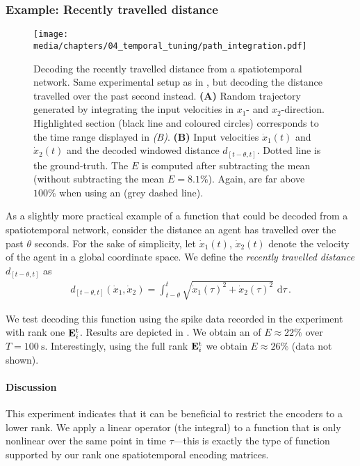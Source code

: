 \subsubsection{Example: Recently travelled distance}

\begin{figure}
	\texttt{[image: media/chapters/04\_temporal\_tuning/path\_integration.pdf]}
	\caption[Decoding the recently travelled distance from a spatiotemporal network]{Decoding the recently travelled distance from a spatiotemporal network. Same experimental setup as in , but decoding the distance travelled over the past second instead.
	\textbf{(A)} Random trajectory generated by integrating the input velocities in $x_1$- and $x_2$-direction.
	Highlighted section (black line and coloured circles) corresponds to the time range displayed in \emph{(B)}.
	\textbf{(B)} Input velocities $\dot x_1(t)$ and $\dot x_2(t)$ and the decoded windowed distance $d_{[t - \theta, t]}$.
	Dotted line is the ground-truth. The \NRMSE $E$ is computed after subtracting the mean (without subtracting the mean $E = 8.1\%$).
	Again, \NRMSEpl are far above $100\%$ when using an \ESN (grey dashed line).
	}
	\label{fig:path_integration}
\end{figure}

As a slightly more practical example of a function that could be decoded from a spatiotemporal network, consider the distance an agent has travelled over the past $\theta$ seconds.
For the sake of simplicity, let $\dot x_1(t)$, $\dot x_2(t)$ denote the velocity of the agent in a global coordinate space.
We define the \emph{recently travelled distance} $d_{[t - \theta, t]}$ as
\begin{align*}
	d_{[t - \theta, t]}(\dot x_1, \dot x_2) = \int_{t - \theta}^t \sqrt{\dot x_1(\tau)^2 + \dot x_2(\tau)^2} \,\,\mathrm{d}\tau \,.
\end{align*}

We test decoding this function using the spike data recorded in the experiment with rank one $\mathbf{E}_i^\mathrm{t}$.
Results are depicted in .
We obtain an \NRMSE of $E \approx 22\%$ over $T = \SI{100}{\second}$.
Interestingly, using the full rank $\mathbf{E}_i^\mathrm{t}$ we obtain $E \approx 26\%$ (data not shown).

\paragraph{Discussion}
This experiment indicates that it can be beneficial to restrict the encoders to a lower rank.
We apply a linear operator (the integral) to a function that is only nonlinear over the same point in time $\tau$---this is exactly the type of function supported by our rank one spatiotemporal encoding matrices.

